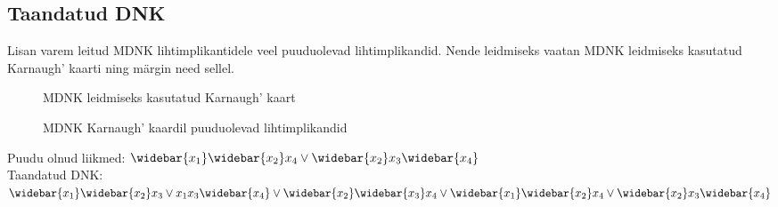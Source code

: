 \documentclass{article}
\newcommand{\wb}{\widebar}
\begin{document}
\subsection{Taandatud DNK}
Lisan varem leitud MDNK lihtimplikantidele veel puuduolevad lihtimplikandid. Nende leidmiseks vaatan MDNK leidmiseks kasutatud Karnaugh' kaarti ning märgin need sellel.

\begin{figure}[H]
\centering
\begin{Karnaugh}
\end{Karnaugh}
\caption{MDNK leidmiseks kasutatud Karnaugh' kaart}
\label{fig:karnaugh-piirkond1}
\end{figure}

\begin{figure}[H]
\centering
\begin{Karnaugh}
\end{Karnaugh}
\caption{MDNK Karnaugh' kaardil puuduolevad lihtimplikandid}
\label{fig:karnaugh-piirkond1}
\end{figure}
Puudu olnud liikmed: $\wb{x_1}\wb{x_2}x_4 \lor \wb{x_2}x_3\wb{x_4}$\\
Taandatud DNK: $\wb{x_1}\wb{x_2}x_3 \lor x_1x_3\wb{x_4} \lor \wb{x_2}\wb{x_3}x_4 \lor \wb{x_1}\wb{x_2}x_4 \lor \wb{x_2}x_3\wb{x_4}$
\end{document}
